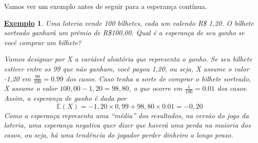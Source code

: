 \documentclass{article}
\newtheorem{example}{\underline{Exemplo}}
\begin{document}
Vamos ver um exemplo antes de seguir para a esperança contínua. 
\begin{example}
  Uma loteria vende 100 bilhetes, cada um valendo R\$ 1,20. O bilhete sorteado ganhará um prêmio de R\$100,00.
  Qual é a esperança de seu ganho se você comprar um bilhete?

  Vamos designar por X a variável aleatória que representa o ganho. Se seu bilhete estiver entre os 99 que não ganham,
  você pagou 1,20, ou seja, X assume o valor -1,20 em \(\frac{99}{100} = 0.99\) dos casos. Caso tenha a sorte de comprar o 
  bilhete sorteado, X assume o valor \(100,00 - 1,20 = 98,80\), o que ocorre em \(\frac{1}{100} = 0.01\) dos casos. Assim,
  a esperança de ganho é dada por 
  \[
    \mathbb{E}(X) = -1,20\times 0,99 + 98,80\times 0.01 = -0,20
  \]
  Como a esperança representa uma ``média'' dos resultados, na versão do jogo da loteria, uma esperança negativa quer dizer que
  haverá uma perda na maioria dos casos, ou seja, há uma tendência do jogador perder dinheiro a longo prazo.
\end{example}
\end{document}
